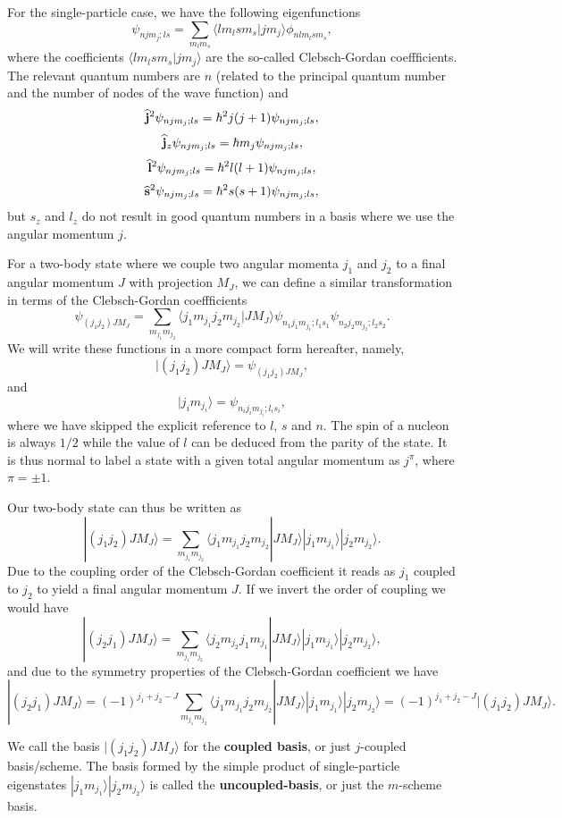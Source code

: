 \begin{enumerate}
For the single-particle case, we have the following eigenfunctions 
\[
\psi_{njm_j;ls}=\sum_{m_lm_s}\langle lm_lsm_s|jm_j\rangle\phi_{nlm_lsm_s},
\]
where the coefficients $\langle lm_lsm_s|jm_j\rangle$ are the so-called Clebsch-Gordan coeffficients.
The relevant quantum numbers are $n$ (related to the principal quantum number and the number of nodes of the wave function) and 
\[
   {\bf\widehat{j}}^2\psi_{njm_j;ls}=\hbar^2j(j+1)\psi_{njm_j;ls},
\]
\[
   {\bf\widehat{j}}_z\psi_{njm_j;ls}=\hbar m_j\psi_{njm_j;ls},
\]
\[
   {\bf\widehat{l}}^2\psi_{njm_j;ls}=\hbar^2l(l+1)\psi_{njm_j;ls},
\]
\[
   {\bf\widehat{s}}^2\psi_{njm_j;ls}=\hbar^2s(s+1)\psi_{njm_j;ls},
\]
but $s_z$ and $l_z$ do not result in good quantum numbers in a basis where we
use the angular momentum $j$.

For a two-body state where we couple two angular momenta $j_1$ and $j_2$ to a final
angular momentum $J$ with projection $M_J$, we can define a similar transformation in terms
of the Clebsch-Gordan coeffficients
\[
\psi_{(j_1j_2)JM_J}=\sum_{m_{j_1}m_{j_2}}\langle j_1m_{j_1}j_2m_{j_2}|JM_J\rangle\psi_{n_1j_1m_{j_1};l_1s_1}\psi_{n_2j_2m_{j_2};l_2s_2}.
\]
We will write these functions in a more compact form hereafter, namely,
\[
|(j_1j_2)JM_J\rangle=\psi_{(j_1j_2)JM_J},
\]
and 
\[
|j_im_{j_i}\rangle=\psi_{n_ij_im_{j_i};l_is_i},
\]
where we have skipped the explicit reference to $l$, $s$ and $n$. The spin of a nucleon is always $1/2$ while the value of $l$ can be deduced from the parity of the state.
It is thus normal to label a state with a given total angular momentum as 
$j^{\pi}$, where $\pi=\pm 1$. 

Our two-body state can thus be written as 
\[
|(j_1j_2)JM_J\rangle=\sum_{m_{j_1}m_{j_2}}\langle j_1m_{j_1}j_2m_{j_2}|JM_J\rangle|j_1m_{j_1}\rangle|j_2m_{j_2}\rangle.
\]
Due to the coupling order of the Clebsch-Gordan coefficient it reads as 
$j_1$ coupled to $j_2$ to yield a final angular momentum $J$. If we invert the order of coupling we would have
\[
|(j_2j_1)JM_J\rangle=\sum_{m_{j_1}m_{j_2}}\langle j_2m_{j_2}j_1m_{j_1}|JM_J\rangle|j_1m_{j_1}\rangle|j_2m_{j_2}\rangle,
\]
and due to the symmetry properties of the Clebsch-Gordan coefficient we have
\[
|(j_2j_1)JM_J\rangle=(-1)^{j_1+j_2-J}\sum_{m_{j_1}m_{j_2}}\langle j_1m_{j_1}j_2m_{j_2}|JM_J\rangle|j_1m_{j_1}\rangle|j_2m_{j_2}\rangle=(-1)^{j_1+j_2-J}|(j_1j_2)JM_J\rangle.
\]

We call the basis $|(j_1j_2)JM_J\rangle$ for the {\bf coupled basis}, or just $j$-coupled basis/scheme. The basis formed by the simple product of single-particle eigenstates 
$|j_1m_{j_1}\rangle|j_2m_{j_2}\rangle$ is called the {\bf uncoupled-basis}, or just the $m$-scheme basis. 


\end{enumerate}
